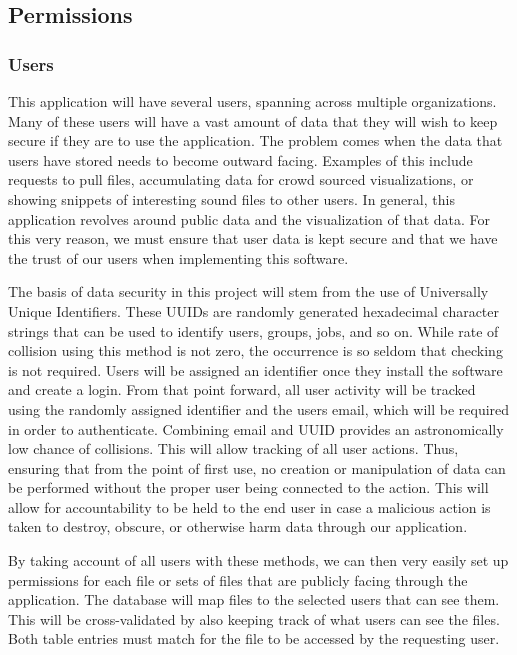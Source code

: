 \subsection{Permissions}
\subsubsection{Users}
This application will have several users, spanning across multiple organizations. Many of these users will have a vast amount of data that they will wish to keep secure if they are to use the application. The problem comes when the data that users have stored needs to become outward facing. Examples of this include requests to pull files, accumulating data for crowd sourced visualizations, or showing snippets of interesting sound files to other users. In general, this application revolves around public data and the visualization of that data. For this very reason, we must ensure that user data is kept secure and that we have the trust of our users when implementing this software.\par
The basis of data security in this project will stem from the use of Universally Unique Identifiers. These UUID\textquotesingle s are randomly generated hexadecimal character strings that can be used to identify users, groups, jobs, and so on. While rate of collision using this method is not zero, the occurrence is so seldom that checking is not required. Users will be assigned an identifier once they install the software and create a login. From that point forward, all user activity will be tracked using the randomly assigned identifier and the user\textquotesingle s email, which will be required in order to authenticate. Combining email and UUID provides an astronomically low chance of collisions. This will allow tracking of all user actions. Thus, ensuring that from the point of first use, no creation or manipulation of data can be performed without the proper user being connected to the action. This will allow for accountability to be held to the end user in case a malicious action is taken to destroy, obscure, or otherwise harm data through our application.\par
By taking account of all users with these methods, we can then very easily set up permissions for each file or sets of files that are publicly facing through the application. The database will map files to the selected users that can see them. This will be cross-validated by also keeping track of what users can see the files. Both table entries must match for the file to be accessed by the requesting user.
